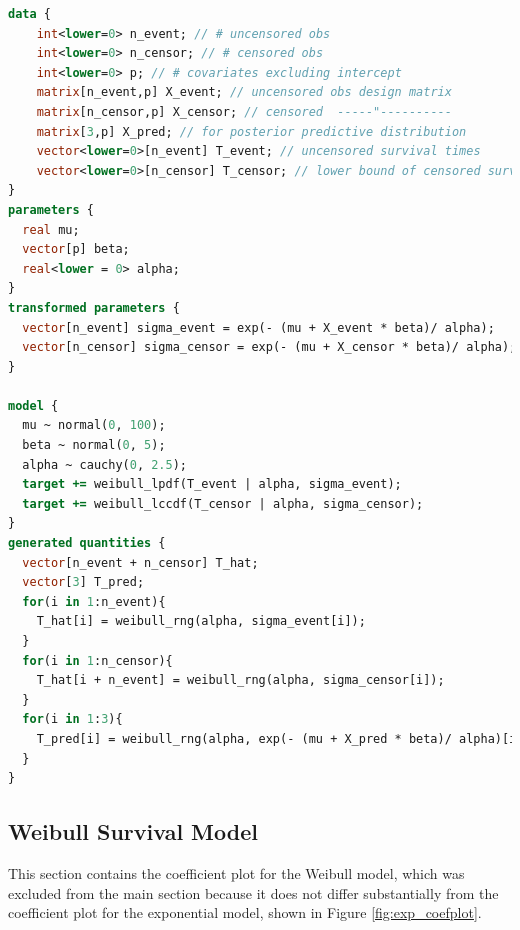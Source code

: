 \begin{lstlisting}[language=Stan, caption = {Weibull Survival Model}, captionpos = t, label = {code:stan_weib}]
data {
    int<lower=0> n_event; // # uncensored obs                                     
    int<lower=0> n_censor; // # censored obs                                    
    int<lower=0> p; // # covariates excluding intercept                                        
    matrix[n_event,p] X_event; // uncensored obs design matrix                           
    matrix[n_censor,p] X_censor; // censored  -----"----------
    matrix[3,p] X_pred; // for posterior predictive distribution
    vector<lower=0>[n_event] T_event; // uncensored survival times                         
    vector<lower=0>[n_censor] T_censor; // lower bound of censored survival times = censor time                  
}
parameters {
  real mu;
  vector[p] beta;
  real<lower = 0> alpha;
}
transformed parameters {
  vector[n_event] sigma_event = exp(- (mu + X_event * beta)/ alpha);
  vector[n_censor] sigma_censor = exp(- (mu + X_censor * beta)/ alpha);
}

model {
  mu ~ normal(0, 100);
  beta ~ normal(0, 5);
  alpha ~ cauchy(0, 2.5);
  target += weibull_lpdf(T_event | alpha, sigma_event);
  target += weibull_lccdf(T_censor | alpha, sigma_censor);
}
generated quantities {
  vector[n_event + n_censor] T_hat;
  vector[3] T_pred;
  for(i in 1:n_event){
    T_hat[i] = weibull_rng(alpha, sigma_event[i]);
  }
  for(i in 1:n_censor){
    T_hat[i + n_event] = weibull_rng(alpha, sigma_censor[i]);
  }
  for(i in 1:3){
    T_pred[i] = weibull_rng(alpha, exp(- (mu + X_pred * beta)/ alpha)[i]); 
  }
}
\end{lstlisting}


\subsection{Weibull Survival Model}
This section contains the coefficient plot for the Weibull model, which was excluded from the main section because it does not differ substantially from the coefficient plot for the exponential model, shown in Figure \ref{fig:exp_coefplot}. 

